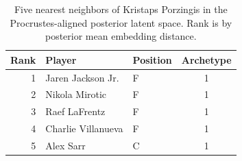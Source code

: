 \begin{table}[htbp]
  \centering\small
  \begin{tabular}{rllc}
    \toprule
    Rank & Player & Position & Archetype \\
    \midrule
    1 & Jaren Jackson Jr. & F & 1 \\
    2 & Nikola Mirotic & F & 1 \\
    3 & Raef LaFrentz & F & 1 \\
    4 & Charlie Villanueva & F & 1 \\
    5 & Alex Sarr & C & 1 \\
    \bottomrule
  \end{tabular}
  \caption{Five nearest neighbors of Kristaps Porzingis in the Procrustes-aligned posterior latent space. Rank is by posterior mean embedding distance.}
  \label{tab:Kristaps_Porzingis_neighbors}
\end{table}

